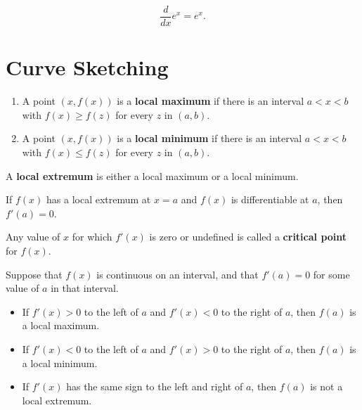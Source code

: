 \documentclass{ximera}
\newcommand{\ddx}{\frac{d}{dx}}
\begin{document}
\begin{theorem}
\[
\ddx e^x = e^x.
\]
\end{theorem}







\section{Curve Sketching}





\begin{definition}\hfil
\begin{enumerate}
\item A point $(x,f(x))$ is a \textbf{local maximum} if there is an interval $a<x<b$ with $f(x)\ge f(z)$ for
every $z$ in $(a,b)$.
\item A point $(x,f(x))$ is a \textbf{local minimum} if
there is an interval $a<x<b$ with $f(x)\le f(z)$ for every $z$ in
$(a,b)$.
\end{enumerate}
A \textbf{local extremum} is either a local
maximum or a local minimum.
\end{definition}



\begin{theorem}
If $f(x)$ has a local extremum at $x=a$ and $f(x)$ is differentiable
at $a$, then $f'(a)=0$.
\end{theorem}



\begin{definition}
Any value of $x$ for which $f'(x)$ is zero or undefined is called a
\textbf{critical point} for $f(x)$.
\end{definition}



\begin{theorem}\label{T:fdt}\hfil
Suppose that $f(x)$ is continuous on an interval, and that $f'(a)=0$
for some value of $a$ in that interval.
\begin{itemize}
\item If $f'(x)>0$ to the left of $a$ and $f'(x)<0$ to the right of
$a$, then $f(a)$ is a local maximum.
\item If $f'(x)<0$ to the left of $a$ and $f'(x)>0$ to the right of
$a$, then $f(a)$ is a local minimum.
\item If $f'(x)$ has the same sign to the left and right of $a$,
then $f(a)$ is not a local extremum.
\end{itemize}
\end{theorem}
\end{document}
